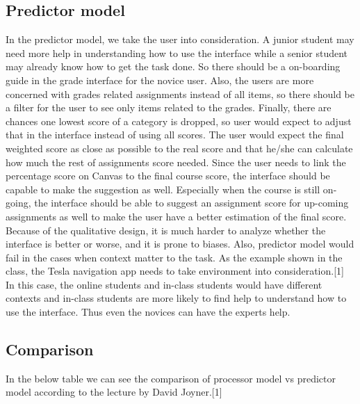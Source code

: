 \documentclass[
	letterpaper, %
]{jdf}
\begin{document}
\subsection{Predictor model}
In the predictor model, we take the user into consideration. A junior student may need more help in understanding how to use the interface while a senior student may already know how to get the task done. So there should be a on-boarding guide in the grade interface for the novice user. Also, the users are more concerned with grades related assignments instead of all items, so there should be a filter for the user to see only items related to the grades. Finally, there are chances one lowest score of a category is dropped, so user would expect to adjust that in the interface instead of using all scores. The user would expect the final weighted score as close as possible to the real score and that he/she can calculate how much the rest of assignments score needed. Since the user needs to link the percentage score on Canvas to the final course score, the interface should be capable to make the suggestion as well. Especially when the course is still on-going, the interface should be able to suggest an assignment score for up-coming assignments as well to make the user have a better estimation of the final score. Because of the qualitative design, it is much harder to analyze whether the interface is better or worse, and it is prone to biases. Also, predictor model would fail in the cases when context matter to the task. As the example shown in the class, the Tesla navigation app needs to take environment into consideration.[1] In this case, the online students and in-class students would have different contexts and in-class students are more likely to find help to understand how to use the interface. Thus even the novices can have the experts help.

\subsection{Comparison}
In the below table we can see the comparison of processor model vs predictor model according to the lecture by David Joyner.[1] 
\end{document}
